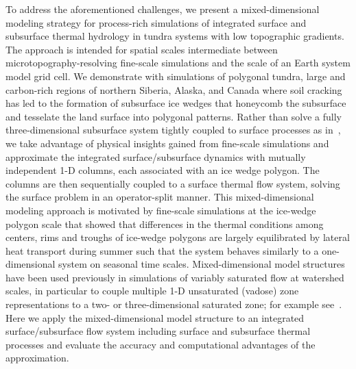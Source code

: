 \documentclass[review]{elsarticle}
\begin{document}
To address the aforementioned challenges, we present a mixed-dimensional modeling strategy for process-rich simulations of integrated surface and subsurface thermal hydrology in tundra systems with low topographic gradients. The approach is intended for spatial scales intermediate between microtopography-resolving fine-scale simulations and the scale of an Earth system model grid cell. We demonstrate with simulations of polygonal tundra, large and carbon-rich regions of northern Siberia, Alaska, and Canada where soil cracking has led to the formation of subsurface ice wedges that honeycomb the subsurface and tesselate the land surface into polygonal patterns. Rather than solve a fully three-dimensional subsurface system tightly coupled to surface processes as in~\cite{spainter2016integrated}, we take advantage of physical insights gained from fine-scale simulations and approximate the integrated surface/subsurface dynamics with mutually independent 1-D columns, each associated with an ice wedge polygon. The columns are then sequentially coupled to a surface thermal flow system, solving the surface problem in an operator-split manner. This mixed-dimensional modeling approach is motivated by fine-scale simulations at the ice-wedge polygon scale that showed that differences in the thermal conditions among centers, rims and troughs of ice-wedge polygons are largely equilibrated by lateral heat transport during summer such that the system behaves similarly to a one-dimensional system on seasonal time scales. Mixed-dimensional model structures have been used previously in simulations of variably saturated flow at watershed scales, in particular to couple multiple 1-D unsaturated (vadose) zone representations to a two- or three-dimensional saturated zone; for example see~\cite{pikul1974numerical,zhu2011method,hybrid3D}. Here we apply the mixed-dimensional model structure to an integrated surface/subsurface flow system including surface and subsurface thermal processes and evaluate the accuracy and computational advantages of the approximation. 

\end{document}

